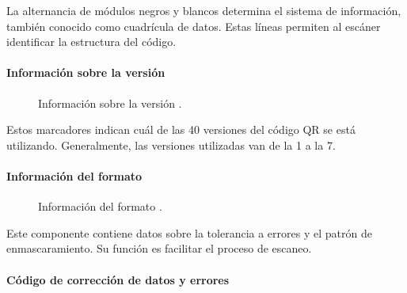 La alternancia de módulos negros y blancos determina el sistema de información, también conocido como cuadrícula de datos. Estas líneas permiten al escáner identificar la estructura del código.

\paragraph{Información sobre la versión}

\begin{figure}[htbp]
	\begin{center}
		\caption{Información sobre la versión \cite{CitaA01}.}
		\label{fig:Version}
	\end{center}
\end{figure}

Estos marcadores indican cuál de las 40 versiones del código QR se está utilizando. Generalmente, las versiones utilizadas van de la 1 a la 7.

\paragraph{Información del formato}

\begin{figure}[htbp]
	\begin{center}
		\caption{Información del formato \cite{CitaA01}.}
		\label{fig:Formato}
	\end{center}
\end{figure}

Este componente contiene datos sobre la tolerancia a errores y el patrón de enmascaramiento. Su función es facilitar el proceso de escaneo.

\paragraph{Código de corrección de datos y errores}

